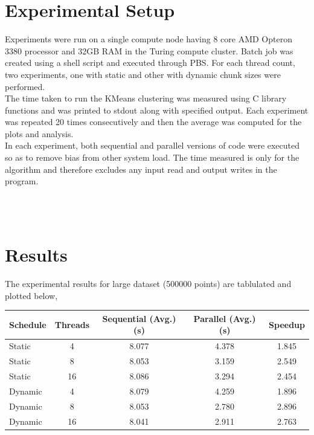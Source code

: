 \documentclass[11pt,a4paper,oneside]{article}
\begin{document}
	
	\section{Experimental Setup}
	Experiments were run on a single compute node having 8 core AMD Opteron 3380 processor and 32GB RAM in the Turing compute cluster. Batch job was created using a shell script and executed through PBS. For each thread count, two experiments, one with static and other with dynamic chunk sizes were performed.\\
	\newline
	The time taken to run the KMeans clustering was measured using C library functions and was printed to stdout along with specified output. Each experiment was repeated 20 times consecutively and then the average was computed for the plots and analysis. \\
	\newline
	In each experiment, both sequential and parallel versions of code were executed so as to remove bias from other system load. The time measured is only for the algorithm and therefore excludes any input read and output writes in the program.\\
	\newline
	
	\begin{verbatim}
					
							
	\end{verbatim}
	
	\section{Results}
	
	The experimental results for large dataset (500000 points) are tablulated and plotted below,
	
	  \begin{center}
		\begin{tabular}{|l|c|c|c|c|}
			\hline 
			\textbf{Schedule} & \textbf{Threads}  & \textbf{Sequential (Avg.) (s)} & \textbf{Parallel (Avg.) (s)} & \textbf{Speedup} \\
			\hline
		    Static & 4 &  8.077 & 4.378 & 1.845\\ 
			\hline 
		     Static & 8 &  8.053 & 3.159 & 2.549\\
			\hline 
			 Static & 16 &  8.086 & 3.294 & 2.454\\
			\hline 
			 Dynamic & 4 &  8.079 & 4.259 & 1.896\\ 
			\hline 
			Dynamic & 8 &  8.053 & 2.780 & 2.896 \\
			\hline 
			Dynamic & 16 &  8.041 & 2.911 & 2.763\\
			\hline 
		\end{tabular}
	\end{center}
	
\end{document}
